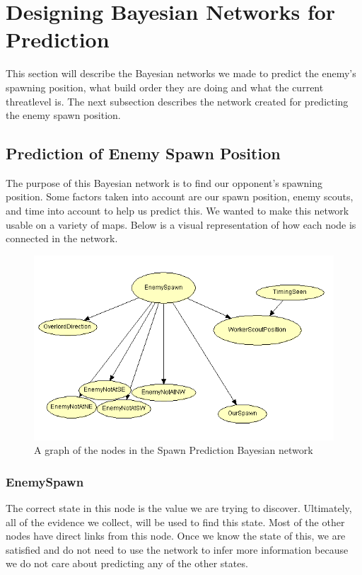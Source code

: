 \section{Designing Bayesian Networks for Prediction}\label{bayesian_network}
This section will describe the Bayesian networks we made to predict the enemy's spawning position, what build order they are doing and what the current 
threatlevel is. The next subsection describes the network created for predicting the enemy spawn position.

\subsection{Prediction of Enemy Spawn Position}			 
			
The purpose of this Bayesian network is to find our opponent's spawning position. Some factors taken into account are our spawn position, enemy scouts, and time into account to help us predict this. We wanted to make this network usable on a variety of maps. Below is a visual representation of how each node is connected in the network.

\begin{figure}[H]
	\includegraphics{Figures/BayesianPictures/SpawnPrediction.png}
	\caption{A graph of the nodes in the Spawn Prediction Bayesian network}
	\label{fig:predicting}
\end{figure}

\subsubsection*{EnemySpawn}
The correct state in this node is the value we are trying to discover. Ultimately, all of the evidence we collect, will be used to find this state. Most of the other nodes have direct links from this node. Once we know the state of this, we are satisfied and do not need to use the network to infer more information because we do not care about predicting any of the other states.

